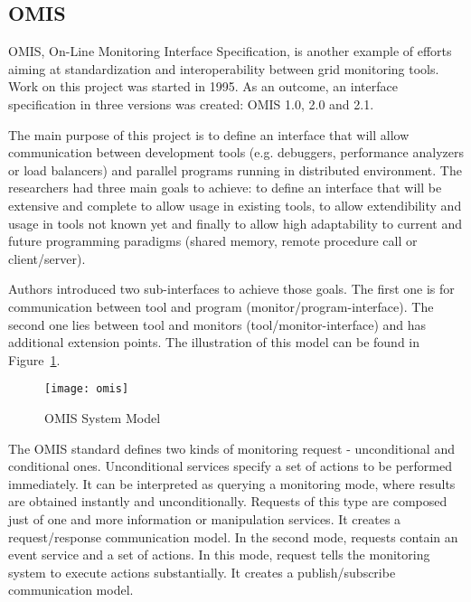 
\subsection{OMIS}

\label{ssec:omis}

OMIS, On-Line Monitoring Interface Specification, is another example of efforts aiming at standardization and interoperability between grid monitoring tools. Work on this project was started in 1995. As an outcome, an interface specification in three versions was created: OMIS 1.0\cite{OMIS1}, 2.0\cite{OMIS2} and 2.1.

The main purpose of this project is to define an interface that will allow communication between development tools (e.g. debuggers, performance analyzers or load balancers) and parallel programs running in distributed environment. The researchers had three main goals to achieve: to define an interface that will be extensive and complete to allow usage in existing tools, to allow extendibility and usage in tools not known yet and finally to allow high adaptability to current and future programming paradigms (shared memory, remote procedure call or client/server).

Authors introduced two sub-interfaces to achieve those goals. The first one is for communication between tool and program (monitor/program-interface). The second one lies between tool and monitors (tool/monitor-interface) and has additional extension points. The illustration of this model can be found in Figure~\ref{fig:omis}.

\begin{figure}[ht]

\centering

\texttt{[image: omis]} \caption{OMIS System Model} \label{fig:omis}

\end{figure}

The OMIS standard defines two kinds of monitoring request - unconditional and conditional ones. Unconditional services specify a set of actions to be performed immediately. It can be interpreted as querying a monitoring mode, where results are obtained instantly and unconditionally. Requests of this type are composed just of one and more information or manipulation services. It creates a request/response communication model. In the second mode, requests contain an event service and a set of actions. In this mode, request tells the monitoring system to execute actions substantially. It creates a publish/subscribe communication model.


